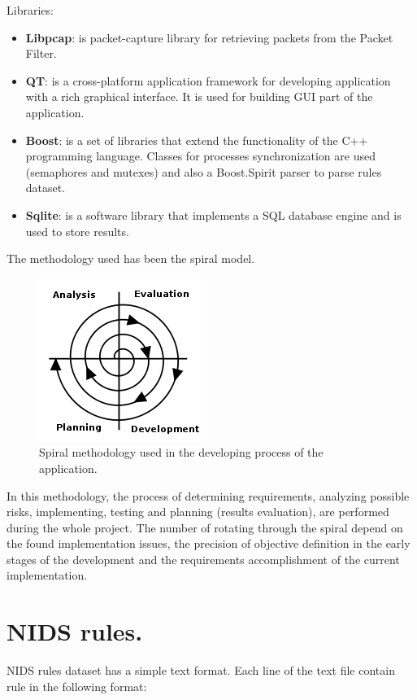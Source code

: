 \documentclass[thesis=M,english]{FITthesis}[2011/07/15]
\begin{document}
Libraries:

\begin{itemize}
\item \textbf{Libpcap}: is packet-capture library for retrieving packets from the Packet Filter.
\item \textbf{QT}: is a cross-platform application framework for developing application with a rich graphical interface. It is used for building GUI part of the application.
\item \textbf{Boost}: is a set of libraries that extend the functionality of the C++ programming language. Classes for processes synchronization are used (semaphores and mutexes) and also a Boost.Spirit parser to parse rules dataset.
\item \textbf{Sqlite}: is a software library that implements a SQL database engine and is used to store results.
\end{itemize}

The methodology used has been the spiral model.
\begin{figure}[h]
\centering
\includegraphics[scale=0.7]{images/spiral-model.png}
\caption{Spiral methodology used in the developing process of the application.}
\end{figure}

In this methodology, the process of determining requirements, analyzing possible risks, implementing, testing and planning (results evaluation), are performed during the whole project. The number of rotating through the spiral depend on the found implementation issues, the precision of objective definition in the early stages of the development and the requirements accomplishment of the current implementation.

\section{NIDS rules.}
NIDS rules dataset has a simple text format. Each line of the text file contain rule in the following format:
\end{document}
